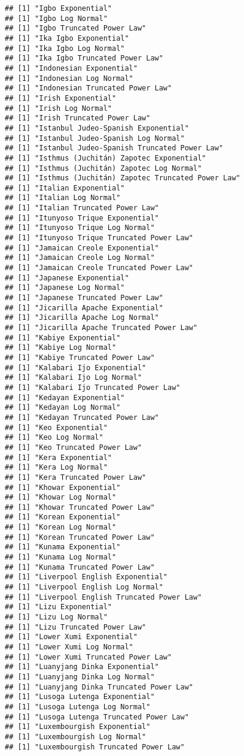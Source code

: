 \documentclass[]{article}
\begin{document}
\begin{verbatim}
## [1] "Igbo Exponential"
## [1] "Igbo Log Normal"
## [1] "Igbo Truncated Power Law"
## [1] "Ika Igbo Exponential"
## [1] "Ika Igbo Log Normal"
## [1] "Ika Igbo Truncated Power Law"
## [1] "Indonesian Exponential"
## [1] "Indonesian Log Normal"
## [1] "Indonesian Truncated Power Law"
## [1] "Irish Exponential"
## [1] "Irish Log Normal"
## [1] "Irish Truncated Power Law"
## [1] "Istanbul Judeo-Spanish Exponential"
## [1] "Istanbul Judeo-Spanish Log Normal"
## [1] "Istanbul Judeo-Spanish Truncated Power Law"
## [1] "Isthmus (Juchitán) Zapotec Exponential"
## [1] "Isthmus (Juchitán) Zapotec Log Normal"
## [1] "Isthmus (Juchitán) Zapotec Truncated Power Law"
## [1] "Italian Exponential"
## [1] "Italian Log Normal"
## [1] "Italian Truncated Power Law"
## [1] "Itunyoso Trique Exponential"
## [1] "Itunyoso Trique Log Normal"
## [1] "Itunyoso Trique Truncated Power Law"
## [1] "Jamaican Creole Exponential"
## [1] "Jamaican Creole Log Normal"
## [1] "Jamaican Creole Truncated Power Law"
## [1] "Japanese Exponential"
## [1] "Japanese Log Normal"
## [1] "Japanese Truncated Power Law"
## [1] "Jicarilla Apache Exponential"
## [1] "Jicarilla Apache Log Normal"
## [1] "Jicarilla Apache Truncated Power Law"
## [1] "Kabiye Exponential"
## [1] "Kabiye Log Normal"
## [1] "Kabiye Truncated Power Law"
## [1] "Kalabari Ijo Exponential"
## [1] "Kalabari Ijo Log Normal"
## [1] "Kalabari Ijo Truncated Power Law"
## [1] "Kedayan Exponential"
## [1] "Kedayan Log Normal"
## [1] "Kedayan Truncated Power Law"
## [1] "Keo Exponential"
## [1] "Keo Log Normal"
## [1] "Keo Truncated Power Law"
## [1] "Kera Exponential"
## [1] "Kera Log Normal"
## [1] "Kera Truncated Power Law"
## [1] "Khowar Exponential"
## [1] "Khowar Log Normal"
## [1] "Khowar Truncated Power Law"
## [1] "Korean Exponential"
## [1] "Korean Log Normal"
## [1] "Korean Truncated Power Law"
## [1] "Kunama Exponential"
## [1] "Kunama Log Normal"
## [1] "Kunama Truncated Power Law"
## [1] "Liverpool English Exponential"
## [1] "Liverpool English Log Normal"
## [1] "Liverpool English Truncated Power Law"
## [1] "Lizu Exponential"
## [1] "Lizu Log Normal"
## [1] "Lizu Truncated Power Law"
## [1] "Lower Xumi Exponential"
## [1] "Lower Xumi Log Normal"
## [1] "Lower Xumi Truncated Power Law"
## [1] "Luanyjang Dinka Exponential"
## [1] "Luanyjang Dinka Log Normal"
## [1] "Luanyjang Dinka Truncated Power Law"
## [1] "Lusoga Lutenga Exponential"
## [1] "Lusoga Lutenga Log Normal"
## [1] "Lusoga Lutenga Truncated Power Law"
## [1] "Luxembourgish Exponential"
## [1] "Luxembourgish Log Normal"
## [1] "Luxembourgish Truncated Power Law"

\end{verbatim}
\end{document}
